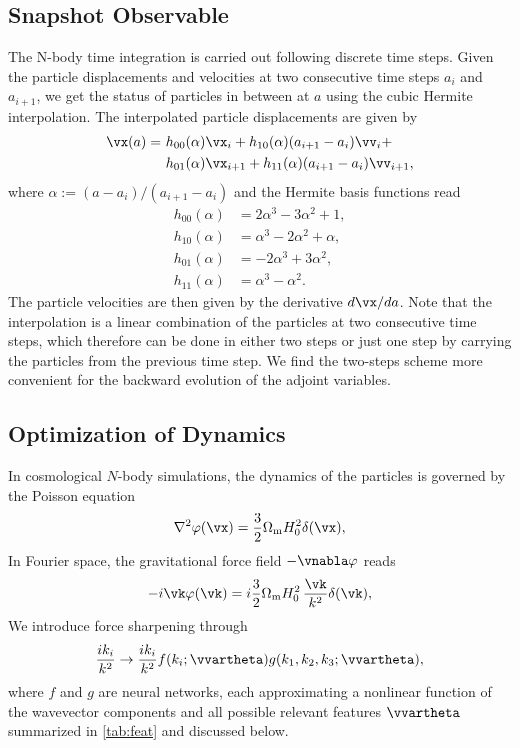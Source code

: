 \documentclass[modern, trackchanges, dvipsnames]{aastex631}
\renewcommand{\d}{d}
\newcommand{\Omegam}{\Omega_\mathrm{m}}
\begin{document}
\vspace{1em}
\subsection{Snapshot Observable}
\label{sec:snapobs}

The N-body time integration is carried out following discrete time steps.
Given the particle displacements and velocities at two consecutive time steps
$a_i$ and $a_{i+1}$, we get the status of particles in between at $a$ using the
cubic Hermite interpolation.
The interpolated particle displacements are given by
\begin{align}
  \vx(a) =\ &h_{00}(\alpha)\vx_i + h_{10}(\alpha)(a_{i+1} - a_i)\vv_i + \nonumber\\
           &h_{01}(\alpha)\vx_{i+1} + h_{11}(\alpha)(a_{i+1} - a_i)\vv_{i+1},
\end{align}
where $\alpha := (a - a_i)/(a_{i+1} - a_i)$ and the Hermite basis functions read
\begin{align}
  h_{00}(\alpha) &= 2\alpha^3 - 3\alpha^2 + 1, \nonumber\\
  h_{10}(\alpha) &= \alpha^3 - 2\alpha^2 + \alpha, \nonumber\\
  h_{01}(\alpha) &= -2\alpha^3 + 3\alpha^2, \nonumber\\
  h_{11}(\alpha) &= \alpha^3 - \alpha^2.
\end{align}
The particle velocities are then given by the derivative $\d\vx / \d a$.
Note that the interpolation is a linear combination of the particles at two
consecutive time steps, which therefore can be done in either two steps or just
one step by carrying the particles from the previous time step.
We find the two-steps scheme more convenient for the backward evolution of the
adjoint variables.


\vspace{1em}
\subsection{Optimization of Dynamics}
\label{sec:so}

In cosmological $N$-body simulations, the dynamics of the particles is governed
by the Poisson equation
%
\begin{equation}
  \nabla^2 \varphi(\vx) = \frac32 \Omegam H_0^2 \delta(\vx),
\end{equation}
%
In Fourier space, the gravitational force field $- \vnabla \varphi$ reads
%
\begin{equation}
- i \vk \varphi(\vk) = i \frac32 \Omegam H_0^2 \,\frac{\vk}{k^2} \delta(\vk),
\end{equation}
%
We introduce force sharpening through
%
\begin{equation}
\frac{i k_i}{k^2} \to \frac{i k_i}{k^2}
  f(k_i; \vvartheta) g(k_1, k_2, k_3; \vvartheta),
\end{equation}
%
where $f$ and $g$ are neural networks, each approximating a nonlinear
function of the wavevector components and all possible relevant features
$\vvartheta$ summarized in \autoref{tab:feat} and discussed below.
\end{document}
